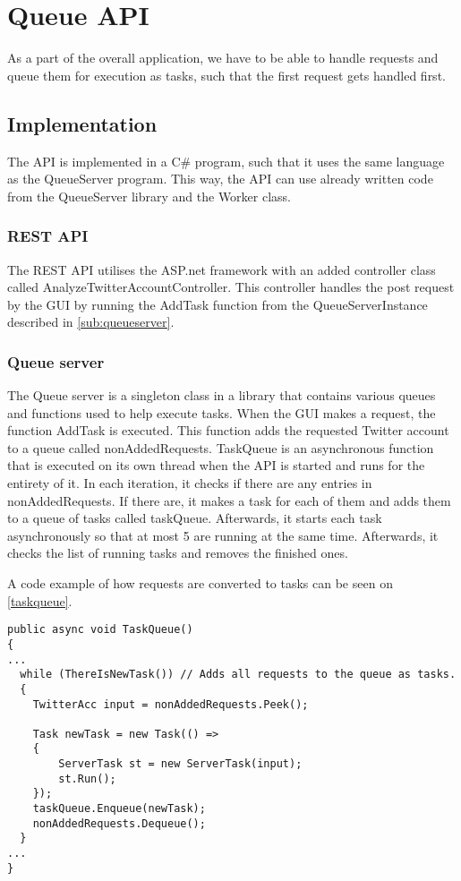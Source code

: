 \chapter{Queue \acs{API}}\label{queueAPI}
As a part of the overall application, we have to be able to handle requests
and queue them for execution as tasks, such that the first request gets handled
first.

\section{Implementation}
The \ac{API} is implemented in a C\# program, such that it uses the same
language as the QueueServer program. This way, the \ac{API} can use already
written code from the QueueServer library and the Worker class.

\subsection{\ac{REST} \ac{API}}
The \ac{REST} \ac{API} utilises the ASP.net framework with an added controller
class called AnalyzeTwitterAccountController. This controller handles the post
request by the GUI by running the AddTask function from the QueueServerInstance
described in \autoref{sub:queueserver}.

\subsection{Queue server} \label{sub:queueserver}
The Queue server is a singleton class in a library that contains various queues
and functions used to help execute tasks. When the GUI makes a request, the
function AddTask is executed. This function adds the requested Twitter account
to a queue called nonAddedRequests. TaskQueue is an asynchronous function that
is executed on its own thread when the \ac{API} is started and runs for the
entirety of it. In each iteration, it checks if there are any entries in
nonAddedRequests. If there are, it makes a task for each of them and adds them
to a queue of tasks called taskQueue. Afterwards, it starts each task
asynchronously so that at most 5 are running at the same time. Afterwards, it
checks the list of running tasks and removes the finished ones. \nl

A code example of how requests are converted to tasks can be seen on
\autoref{taskqueue}. \\

\begin{minipage}[H]{\linewidth}
\begin{lstlisting}[caption = Adding tasks to the queue, label = taskqueue] 
public async void TaskQueue()
{
...
  while (ThereIsNewTask()) // Adds all requests to the queue as tasks.
  {
	TwitterAcc input = nonAddedRequests.Peek();
	
	Task newTask = new Task(() =>
	{
	    ServerTask st = new ServerTask(input);
	    st.Run();
	});
	taskQueue.Enqueue(newTask);
	nonAddedRequests.Dequeue();
  }
...  
}

\end{lstlisting}
\end{minipage}

